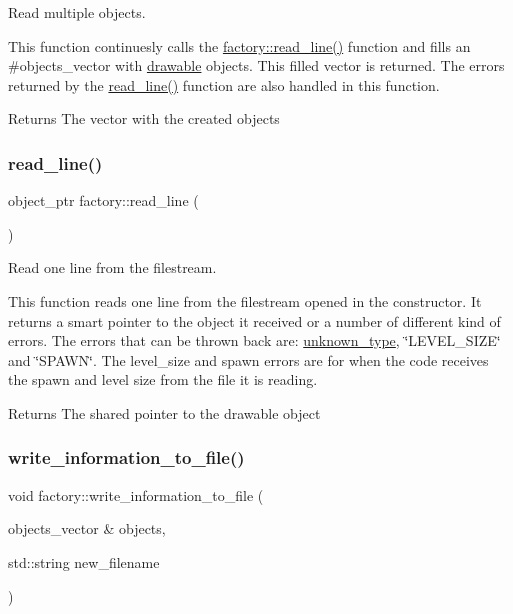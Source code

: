 Read multiple objects. 

This function continuesly calls the \hyperlink{classfactory_a82385866bc910c1b3a3e82d56487dd24}{factory\+::read\+\_\+line()} function and fills an \#objects\+\_\+vector with \hyperlink{classdrawable}{drawable} objects. This filled vector is returned. The errors returned by the \hyperlink{classfactory_a82385866bc910c1b3a3e82d56487dd24}{read\+\_\+line()} function are also handled in this function. \begin{DoxyReturn}{Returns}
The vector with the created objects 
\end{DoxyReturn}
\mbox{\label{classfactory_a82385866bc910c1b3a3e82d56487dd24}} 
\subsubsection{\texorpdfstring{read\+\_\+line()}{read\_line()}}
{\footnotesize\ttfamily object\+\_\+ptr factory\+::read\+\_\+line (\begin{DoxyParamCaption}{ }\end{DoxyParamCaption})}



Read one line from the filestream. 

This function reads one line from the filestream opened in the constructor. It returns a smart pointer to the object it received or a number of different kind of errors. The errors that can be thrown back are\+: \hyperlink{classunknown__type}{unknown\+\_\+type}, \char`\"{}\+L\+E\+V\+E\+L\+\_\+\+S\+I\+Z\+E\char`\"{} and \char`\"{}\+S\+P\+A\+W\+N\char`\"{}. The level\+\_\+size and spawn errors are for when the code receives the spawn and level size from the file it is reading. \begin{DoxyReturn}{Returns}
The shared pointer to the drawable object 
\end{DoxyReturn}
\mbox{\label{classfactory_af17f2a44d75cf8ccf712384341c2fcde}} 
\subsubsection{\texorpdfstring{write\+\_\+information\+\_\+to\+\_\+file()}{write\_information\_to\_file()}}
{\footnotesize\ttfamily void factory\+::write\+\_\+information\+\_\+to\+\_\+file (\begin{DoxyParamCaption}\item[{objects\+\_\+vector \&}]{objects,  }\item[{std\+::string}]{new\+\_\+filename }\end{DoxyParamCaption})}



